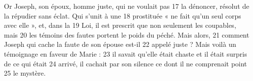 Or Joseph, son époux, homme juste, qui ne voulait pas	 
17	 	la dénoncer, résolut de la répudier sans éclat. Qui s'unit à une	 
18	 	prostituée « ne fait qu'un seul corps avec elle », et, dans la	 
19	 	Loi, il est prescrit que non seulement les coupables, mais	 
20	 	les témoins des fautes portent le poids du péché. Mais alors,	 
21	 	comment Joseph qui cache la faute de son épouse est-il	 
22	 	appelé juste ? Mais voilà un témoignage en faveur de Marie :	 
23	 	il savait qu'elle était chaste et il était surpris de ce qui était	 
24	 	arrivé, il cachait par son silence ce dont il ne comprenait point	 
25	 	le mystère.